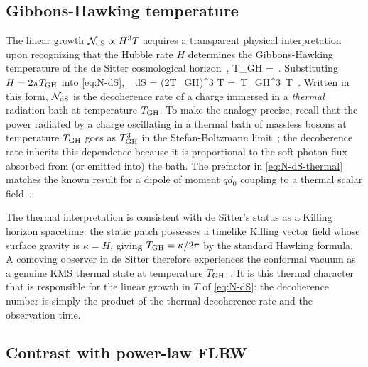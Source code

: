 \subsection{Gibbons-Hawking temperature}
\label{sec:desitter-thermal}

The linear growth $\mathcal{N}_{\rm dS} \propto H^3 T$ acquires a transparent
physical interpretation upon recognizing that the Hubble rate $H$ determines
the Gibbons-Hawking temperature of the de Sitter cosmological
horizon~\cite{Gibbons:1977mu},
%
\be
  T_{\rm GH} =  \,.
  \label{eq:TGH}
\ee
%
Substituting $H = 2\pi T_{\rm GH}$ into \cref{eq:N-dS},
%
\be
  \Nnum_{\rm dS}
  =
  \lb(2\pi T_{\rm GH}\rb)^3 T
  =
  \,T_{\rm GH}^3\, T \,.
  \label{eq:N-dS-thermal}
\ee
%
Written in this form, $\mathcal{N}_{\rm dS}$ is the decoherence rate of a charge
immersed in a \emph{thermal} radiation bath at temperature $T_{\rm GH}$.  To
make the analogy precise, recall that the power radiated by a charge
oscillating in a thermal bath of massless bosons at temperature $T_{\rm GH}$
goes as $T_{\rm GH}^3$ in the Stefan-Boltzmann limit~\cite{DSW2022,DSW2025a};
the decoherence rate inherits this dependence because it is proportional to
the soft-photon flux absorbed from (or emitted into) the bath.  The prefactor
in \cref{eq:N-dS-thermal} matches the known result for a dipole of moment
$qd_0$ coupling to a thermal scalar field~\cite{Danielson:2022tdw,DSW2025a}.

The thermal interpretation is consistent with de Sitter's status as a Killing
horizon spacetime: the static patch possesses a timelike Killing vector field
whose surface gravity is $\kappa = H$, giving $T_{\rm GH} = \kappa/2\pi$ by
the standard Hawking formula.  A comoving observer in de Sitter therefore
experiences the conformal vacuum as a genuine KMS thermal state at temperature
$T_{\rm GH}$~\cite{Gibbons:1977mu,Allen1985}.  It is this thermal character
that is responsible for the linear growth in $T$ of \cref{eq:N-dS}: the
decoherence number is simply the product of the thermal decoherence rate and
the observation time.

\subsection{Contrast with power-law FLRW}
\label{sec:desitter-contrast}

